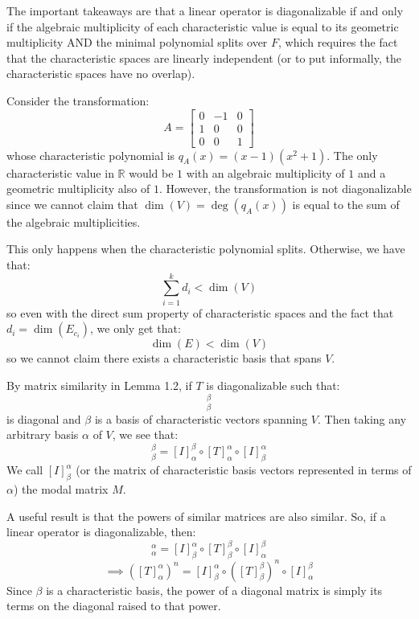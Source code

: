 \documentclass[10pt,letterpaper]{article} %
\begin{document}
The important takeaways are that a linear operator is diagonalizable if and only if the algebraic multiplicity of each characteristic value is equal to its geometric multiplicity AND the minimal polynomial splits over $F$, which requires the fact that
the characteristic spaces are linearly independent (or to put informally, the characteristic spaces have no overlap).

Consider the transformation:
\begin{equation*}
A = \begin{bmatrix}
0 & -1 & 0\\
1 & 0 & 0\\
0 & 0 & 1
\end{bmatrix}
\end{equation*}
whose characteristic polynomial is $q_A(x) = (x-1)(x^2+1)$. The only characteristic value in $\mathbb{R}$ would be $1$ with an algebraic multiplicity of $1$ and a geometric multiplicity also of $1$.
However, the transformation is not diagonalizable since we cannot claim that $\dim(V) = \deg(q_A(x))$ is equal to the sum of the algebraic multiplicities.

This only happens when the characteristic polynomial splits. Otherwise, we have that:
\begin{equation*}
\sum_{i=1}^k d_i < \dim(V)
\end{equation*}
so even with the direct sum property of characteristic spaces and the fact that $d_i = \dim(E_{c_i})$, we only get that:
\begin{equation*}
\dim(E) < \dim(V)
\end{equation*}
so we cannot claim there exists a characteristic basis that spans $V$.

By matrix similarity in Lemma 1.2, if $T$ is diagonalizable such that:
\begin{equation*}
[T]_\beta^\beta
\end{equation*}
is diagonal and $\beta$ is a basis of characteristic vectors spanning $V$. Then taking any arbitrary basis $\alpha$ of $V$, we see that:
\begin{equation*}
[T]_\beta^\beta = [I]_\alpha^\beta \circ [T]_\alpha^\alpha \circ [I]_\beta^\alpha
\end{equation*}
We call $[I]_\beta^\alpha$ (or the matrix of characteristic basis vectors represented in terms of $\alpha$) the modal matrix $M$.

A useful result is that the powers of similar matrices are also similar. So, if a linear operator is diagonalizable, then:
\begin{equation*}
[T]_\alpha^\alpha = [I]_\beta^\alpha \circ [T]_\beta^\beta \circ [I]_\alpha^\beta
\end{equation*}
\begin{equation*}
\implies ([T]_\alpha^\alpha)^n = [I]_\beta^\alpha \circ ([T]_\beta^\beta)^n \circ [I]_\alpha^\beta
\end{equation*}
Since $\beta$ is a characteristic basis, the power of a diagonal matrix is simply its terms on the diagonal raised to that power.
\end{document}

